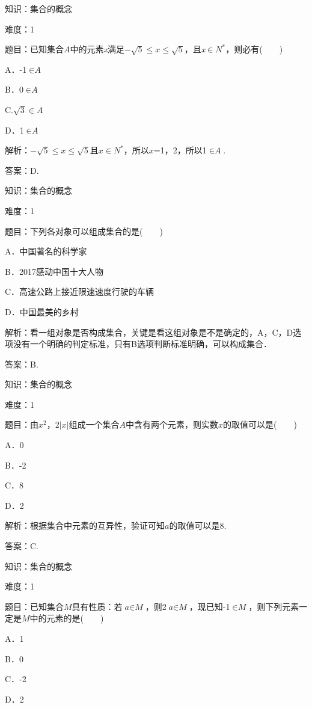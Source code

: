 \documentclass{article} %
\begin{document}
知识：集合的概念

难度：1

题目：已知集合\textit{A}中的元素\textit{x}满足$-\sqrt{5}\mathrm{\le}\textit{x}\mathrm{\le}\sqrt{5}$，且\textit{x}$\mathrm{\in}{N}^{*}$，则必有(　　)

A．-1$\mathrm{\in}\textit{A}$

B．0$\mathrm{\in}\textit{A}$

C.$\sqrt{3}\mathrm{\in}\textit{A}$

D．1$\mathrm{\in}\textit{A}$

解析：$-\sqrt{5}\mathrm{\le}\textit{x}\mathrm{\le}\sqrt{5}$且$\textit{x}\mathrm{\in}{N}^{*}$，所以$\textit{x}$=1，2，所以1$\mathrm{\in}\textit{A}$.

答案：D.

知识：集合的概念

难度：1

题目：下列各对象可以组成集合的是(　　)

A．中国著名的科学家

B．2017感动中国十大人物

C．高速公路上接近限速速度行驶的车辆

D．中国最美的乡村

解析：看一组对象是否构成集合，关键是看这组对象是不是确定的，A，C，D选项没有一个明确的判定标准，只有B选项判断标准明确，可以构成集合．

答案：B.

知识：集合的概念

难度：1

题目：由$\textit{x}{}^{2}$，2$|\textit{x}|$组成一个集合$\textit{A}$中含有两个元素，则实数$\textit{x}$的取值可以是(　　)

A．0  

B．-2  

C．8  

D．2

解析：根据集合中元素的互异性，验证可知$\textit{a}$的取值可以是8.

答案：C.

知识：集合的概念

难度：1

题目：已知集合$\textit{M}$具有性质：若$\textit{a}\mathrm{\in}\textit{M}$，则2$\textit{a}\mathrm{\in}\textit{M}$，现已知-1$\mathrm{\in}\textit{M}$，则下列元素一定是$\textit{M}$中的元素的是(　　)

A．1  

B．0  

C．-2  

D．2
\end{document}
